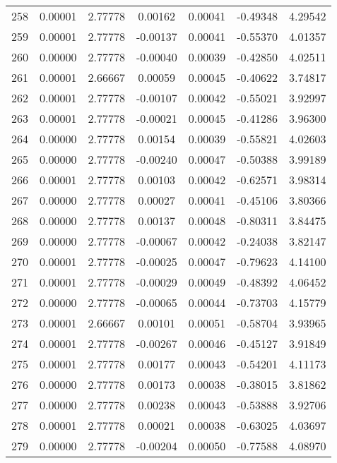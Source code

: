 \begin{longtable}{c c c c c c c}
258 &  0.00001 &      2.77778 &  0.00162 &   0.00041 &  -0.49348 &   4.29542 \\
259 &  0.00001 &      2.77778 & -0.00137 &   0.00041 &  -0.55370 &   4.01357 \\
260 &  0.00000 &      2.77778 & -0.00040 &   0.00039 &  -0.42850 &   4.02511 \\
261 &  0.00001 &      2.66667 &  0.00059 &   0.00045 &  -0.40622 &   3.74817 \\
262 &  0.00001 &      2.77778 & -0.00107 &   0.00042 &  -0.55021 &   3.92997 \\
263 &  0.00001 &      2.77778 & -0.00021 &   0.00045 &  -0.41286 &   3.96300 \\
264 &  0.00000 &      2.77778 &  0.00154 &   0.00039 &  -0.55821 &   4.02603 \\
265 &  0.00000 &      2.77778 & -0.00240 &   0.00047 &  -0.50388 &   3.99189 \\
266 &  0.00001 &      2.77778 &  0.00103 &   0.00042 &  -0.62571 &   3.98314 \\
267 &  0.00000 &      2.77778 &  0.00027 &   0.00041 &  -0.45106 &   3.80366 \\
268 &  0.00000 &      2.77778 &  0.00137 &   0.00048 &  -0.80311 &   3.84475 \\
269 &  0.00000 &      2.77778 & -0.00067 &   0.00042 &  -0.24038 &   3.82147 \\
270 &  0.00001 &      2.77778 & -0.00025 &   0.00047 &  -0.79623 &   4.14100 \\
271 &  0.00001 &      2.77778 & -0.00029 &   0.00049 &  -0.48392 &   4.06452 \\
272 &  0.00000 &      2.77778 & -0.00065 &   0.00044 &  -0.73703 &   4.15779 \\
273 &  0.00001 &      2.66667 &  0.00101 &   0.00051 &  -0.58704 &   3.93965 \\
274 &  0.00001 &      2.77778 & -0.00267 &   0.00046 &  -0.45127 &   3.91849 \\
275 &  0.00001 &      2.77778 &  0.00177 &   0.00043 &  -0.54201 &   4.11173 \\
276 &  0.00000 &      2.77778 &  0.00173 &   0.00038 &  -0.38015 &   3.81862 \\
277 &  0.00000 &      2.77778 &  0.00238 &   0.00043 &  -0.53888 &   3.92706 \\
278 &  0.00001 &      2.77778 &  0.00021 &   0.00038 &  -0.63025 &   4.03697 \\
279 &  0.00000 &      2.77778 & -0.00204 &   0.00050 &  -0.77588 &   4.08970 \\

\end{longtable}

